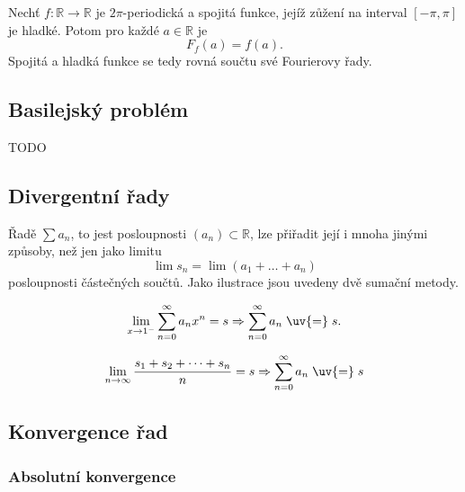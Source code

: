 \documentclass[../main.tex]{subfiles}
\begin{document}
\begin{consequence}
    Nechť $f:\mathbb{R}\to\mathbb{R}$ je $2\pi$-periodická a spojitá funkce, jejíž
    zůžení na interval $[-\pi,\pi]$ je hladké. Potom pro každé $a\in\mathbb{R}$ je
    \[ F_f(a) = f(a). \]
    Spojitá a hladká funkce se tedy rovná součtu své Fourierovy řady.
\end{consequence}

\subsection{Basilejský problém}

\begin{example}
    \LARGE
    TODO
\end{example}

\subsection{Divergentní řady}

Řadě $\sum a_n$, to jest posloupnosti $(a_n)\subset \mathbb{R}$, lze přiřadit její  i mnoha jinými způsoby,
než jen jako limitu \[ \lim s_n = \lim (a_1 + \dots + a_n) \] posloupnosti částečných součtů.
Jako ilustrace jsou uvedeny dvě sumační metody.

\begin{fact}
    \[\lim_{x\to 1^-} \sum_{n=0}^{\infty} a_nx^n = s \Rightarrow \sum_{n=0}^{\infty} a_n \hspace{1mm} \text{\uv{=}} \hspace{1mm} s. \]
\end{fact}

\begin{fact}
    \[ \lim_{n\to \infty} \frac{s_1 + s_2 + \dots + s_n}{n} = s \Rightarrow \sum_{n=0}^{\infty} a_n \hspace{1mm} \text{\uv{=}} \hspace{1mm} s \]
\end{fact}


\subsection{Konvergence řad}

\subsubsection{Absolutní konvergence}
\end{document}
